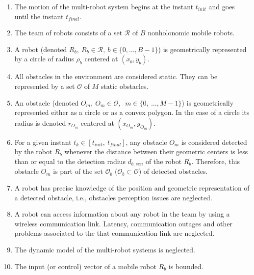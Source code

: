\documentclass[eprint]{actapoly}
\begin{document}
\begin{enumerate}

    \item The motion of the multi-robot system begins at
    the instant $t_{init}$ and goes until the instant $t_{final}$.

    \item The team of robots consists of a set $\mathcal{R}$ of $B$
    nonholonomic mobile robots.
    
    \item A robot (denoted $R_b,\ R_b \in \mathcal{R},\ b \in \{0,\dots,B-1\}$) is 
    geometrically represented by a circle of radius $\rho_b$ centered at
    $(x_b, y_b)$.
        
    \item All obstacles in the environment are considered static. They can be
    represented by a set $\mathcal{O}$ of $M$ static obstacles.
    
    \item An obstacle (denoted $O_m,\ $\mbox{$O_m \in \mathcal{O}$}$,\ $
    \mbox{$m \in \{0,\ \dots, M-1\}$}) is geometrically represented either as
    a circle or as a convex polygon. In the case of a circle its radius is
    denoted $r_{O_m}$ centered at $(x_{O_m},y_{O_m})$.
    
    \item For a given instant $t_k \in [t_{init},\ t_{final}]$, any obstacle
    $O_m$ is considered detected by the robot $R_b$ whenever the distance between
    their geometric centers is less than or equal to the detection radius $d_{b,sen}$
    of the robot $R_b$.
    Therefore, this obstacle $O_m$ is part of the set $\mathcal{O}_b$
    ($\mathcal{O}_b \subset \mathcal{O}$) of detected obstacles.
    
    \item A robot has precise knowledge of the position and geometric 
    representation of a detected obstacle, i.e., obstacles perception issues
    are neglected.
    
    \item A robot can access 
    information about any robot in the team by using 
    a wireless communication link. Latency, communication outages and other
    problems associated
    to the that communication link are neglected.
        
    \item The dynamic model of the multi-robot systems is neglected.
    
    \item The input (or control) vector of a mobile robot $R_b$ is bounded.
    

\end{enumerate}
\end{document}
